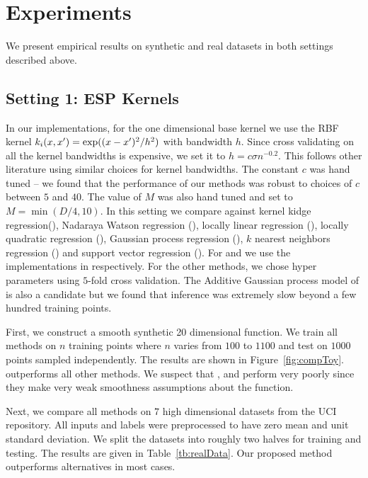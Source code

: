 \section{Experiments}
\label{sec:experiments}

\insertTableRealData

We present empirical results on synthetic and real datasets in both settings
described above.

\subsection{Setting 1: ESP Kernels}

In our implementations, for the one dimensional base kernel we use
the RBF kernel $k_i(x,x') = \exp((x-x')^2/h^2)$ with bandwidth $h$.
Since cross validating on all the kernel bandwidths is expensive, we set
it to $h = c\sigma n^{-0.2}$. This follows other literature 
\cite{gyorfi02distributionfree,ravikumar09spam} using similar choices for kernel
bandwidths. The constant $c$ was hand tuned -- we found that the performance of
our methods was robust to choices of $c$ between $5$ and $40$.
The value of $M$ was also hand tuned and set to $M = \min(D/4, 10)$.
In this setting we compare \addkrrs against kernel kidge regression(\krr),
Nadaraya Watson regression (\nw), locally linear regression (\locallin), locally
quadratic regression (\localquad), Gaussian process regression (\gp), $k$
nearest neighbors regression (\knn) and support vector regression (\svr).
For \gps and \svrs we use the implementations in
\citet{rasmussen10gpml,chang11libsvm} respectively.
For the other methods, we chose hyper parameters using $5$-fold cross
validation.
The Additive Gaussian process model of \citep{duvenaud11additivegps} is also a
candidate but we found that inference was extremely slow beyond a few hundred
training points.

First, we construct a smooth synthetic 20 dimensional function. We train all methods on
$n$ training points where $n$ varies from $100$ to $1100$ and test on $1000$
points sampled independently. The results are shown in Figure~\ref{fig:compToy}.
\addkrrs outperforms all other methods. We suspect that \nw, \locallin and \knn perform
very poorly since they make very weak smoothness assumptions about the function.

Next, we compare all methods on $7$ high dimensional datasets from the UCI
repository. All inputs and labels were preprocessed to have zero mean and unit
standard deviation. We split the datasets into roughly two halves for training
and testing. The results are given in Table~\ref{tb:realData}. Our proposed
method outperforms alternatives in most cases.

\insertFigCompToy



